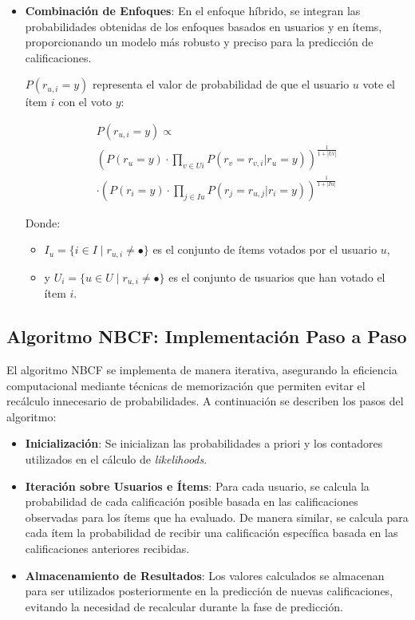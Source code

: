 \documentclass[twocolumn, fontsize=10pt]{article}
\begin{document}
\begin{itemize}
    
    \item \textbf{Combinación de Enfoques}: 
    En el enfoque híbrido, se integran las 
    probabilidades obtenidas de los enfoques basados 
    en usuarios y en ítems, proporcionando un modelo 
    más robusto y preciso para la predicción de 
    calificaciones.

    $P(r_{u,i} = y)$ representa el valor de
    probabilidad de que el usuario $u$ vote el ítem $i$ 
    con el voto $y$:

    \begin{multline}
        P(r_{u,i} = y) \propto \\ \left( P(r_u = y) \cdot \prod_{v \in Ui} P(r_v = r_{v,i} | r_u = y) \right)^{\frac{1}{1+|Ui|}} \\
        \cdot \left( P(r_i = y) \cdot \prod_{j \in Iu} P(r_j = r_{u,j} | r_i = y) \right)^{\frac{1}{1+|Iu|}}
    \end{multline} \cite{tesis_sistema_recomendador_hibrido}

    Donde:
    \begin{itemize}
        \item $I_u = \{i \in I \mid r_{u,i} \neq \bullet \}$ es el conjunto de ítems votados por el usuario $u$,
        \item y $U_i = \{u \in U \mid r_{u,i} \neq \bullet \}$ es el conjunto de usuarios que han votado el ítem $i$.
    \end{itemize} 
\end{itemize}
 

\subsection{Algoritmo NBCF: Implementación Paso a Paso}

El algoritmo NBCF se implementa de manera iterativa, 
asegurando la eficiencia computacional mediante 
técnicas de memorización que permiten evitar el 
recálculo innecesario de probabilidades. 
A continuación se describen los pasos del algoritmo:

\begin{itemize}
    \item \textbf{Inicialización}: 
    Se inicializan las probabilidades a priori y los 
    contadores utilizados en el cálculo de 
    \textit{likelihoods}.
    \item \textbf{Iteración sobre Usuarios e Ítems}: 
    Para cada usuario, se calcula la probabilidad de 
    cada calificación posible basada en las 
    calificaciones observadas para los ítems que 
    ha evaluado. De manera similar, se calcula para 
    cada ítem la probabilidad de recibir una 
    calificación específica basada en las 
    calificaciones anteriores recibidas.
    \item \textbf{Almacenamiento de Resultados}: 
    Los valores calculados se almacenan para ser 
    utilizados posteriormente en la predicción de 
    nuevas calificaciones, evitando la necesidad de 
    recalcular durante la fase de predicción.
\end{itemize}
\end{document}
